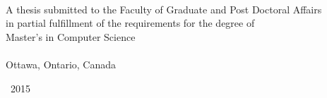\begin{titlepage}
  \begin{addmargin}[-1cm]{-3cm}
    \begin{center}
        \large

        \hfill

        \vfill

        \begingroup
            \color{Maroon}\spacedallcaps{\myTitle} \\ \bigskip
        \endgroup

        \spacedlowsmallcaps{\myName}

        \vfill


        {\footnotesize A thesis submitted to the Faculty of Graduate and Post Doctoral Affairs\\
         in partial fulfillment of the requirements for the degree of} \\ \medskip
        Master's {\footnotesize in} Computer Science \\ \bigskip
        \myUni \\ %
        {\footnotesize Ottawa, Ontario, Canada}

        \vfill

        {\footnotesize \textcopyright\ 2015 \myName}
    \end{center}
  \end{addmargin}
\end{titlepage}

